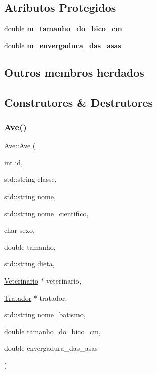 \subsection*{Atributos Protegidos}
\begin{DoxyCompactItemize}
\item 
\mbox{\label{classAve_a6b226ae4077430877b040141105a9890}} 
double {\bfseries m\+\_\+tamanho\+\_\+do\+\_\+bico\+\_\+cm}
\item 
\mbox{\label{classAve_a6261373aae903e524e220e53ded18693}} 
double {\bfseries m\+\_\+envergadura\+\_\+das\+\_\+asas}
\end{DoxyCompactItemize}
\subsection*{Outros membros herdados}


\subsection{Construtores \& Destrutores}
\mbox{\label{classAve_aa1a19a4a964c41107df2886261f055e8}} 
\subsubsection{\texorpdfstring{Ave()}{Ave()}\hspace{0.1cm}{\footnotesize\ttfamily [1/3]}}
{\footnotesize\ttfamily Ave\+::\+Ave (\begin{DoxyParamCaption}\item[{int}]{id,  }\item[{std\+::string}]{classe,  }\item[{std\+::string}]{nome,  }\item[{std\+::string}]{nome\+\_\+cientifico,  }\item[{char}]{sexo,  }\item[{double}]{tamanho,  }\item[{std\+::string}]{dieta,  }\item[{\hyperlink{classVeterinario}{Veterinario} $\ast$}]{veterinario,  }\item[{\hyperlink{classTratador}{Tratador} $\ast$}]{tratador,  }\item[{std\+::string}]{nome\+\_\+batismo,  }\item[{double}]{tamanho\+\_\+do\+\_\+bico\+\_\+cm,  }\item[{double}]{envergadura\+\_\+das\+\_\+asas }\end{DoxyParamCaption})}




